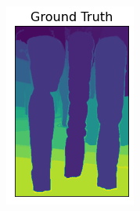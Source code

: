 \documentclass[12pt]{extarticle}
\begin{document}
\begin{figure}[!h]
\begin{subfigure}[b]{0.19\textwidth}
      \end{subfigure}
      \hfill
      \begin{subfigure}[b]{0.19\textwidth}
        \includegraphics[width=\textwidth]{truth_compared.png}
        \caption{}
        \label{fig:f2}
      \end{subfigure}
      \hfill
      \begin{subfigure}[b]{0.19\textwidth}

\end{subfigure}
\end{figure}
\end{document}
